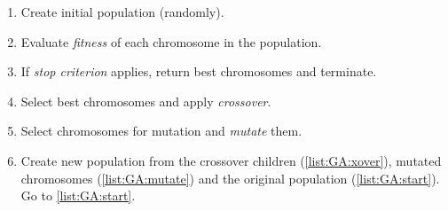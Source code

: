 \documentclass[../ThesisDoc]{subfiles}
\begin{document}
\begin{enumerate}[start=0]
  \item Create initial population (randomly).
  \item\label{list:GA:start} Evaluate \emph{fitness} of each chromosome in the population.
  \item If \emph{stop criterion} applies, return best chromosomes and terminate.
  \item\label{list:GA:xover} Select best chromosomes and apply \emph{crossover}.
  \item\label{list:GA:mutate} Select chromosomes for mutation and \emph{mutate} them.
  \item Create new population from the crossover children (\ref{list:GA:xover}),
        mutated chromosomes (\ref{list:GA:mutate}) and the original population
        (\ref{list:GA:start}).
        Go to \ref{list:GA:start}.
\end{enumerate}
\end{document}
